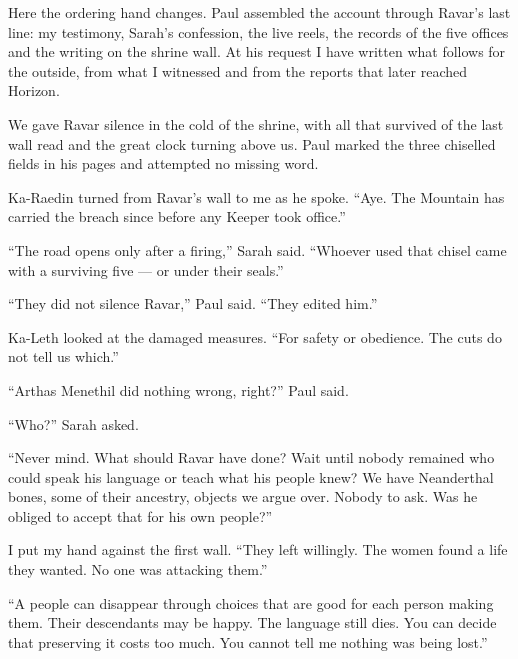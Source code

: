 
Here the ordering hand changes. Paul assembled the account through Ravar's last line: my testimony, Sarah's confession, the live reels, the records of the five offices and the writing on the shrine wall. At his request I have written what follows for the outside, from what I witnessed and from the reports that later reached Horizon.\par

We gave Ravar silence in the cold of the shrine, with all that survived of the last wall read and the great clock turning above us. Paul marked the three chiselled fields in his pages and attempted no missing word.\par

Ka-Raedin turned from Ravar's wall to me as he spoke. ``Aye. The Mountain has carried the breach since before any Keeper took office.''\par

``The road opens only after a firing,'' Sarah said. ``Whoever used that chisel came with a surviving five --- or under their seals.''\par

``They did not silence Ravar,'' Paul said. ``They edited him.''\par

Ka-Leth looked at the damaged measures. ``For safety or obedience. The cuts do not tell us which.''\par

``Arthas Menethil did nothing wrong, right?'' Paul said.\par

``Who?'' Sarah asked.\par

``Never mind. What should Ravar have done? Wait until nobody remained who could speak his language or teach what his people knew? We have Neanderthal bones, some of their ancestry, objects we argue over. Nobody to ask. Was he obliged to accept that for his own people?''\par

I put my hand against the first wall. ``They left willingly. The women found a life they wanted. No one was attacking them.''\par

``A people can disappear through choices that are good for each person making them. Their descendants may be happy. The language still dies. You can decide that preserving it costs too much. You cannot tell me nothing was being lost.''\par

